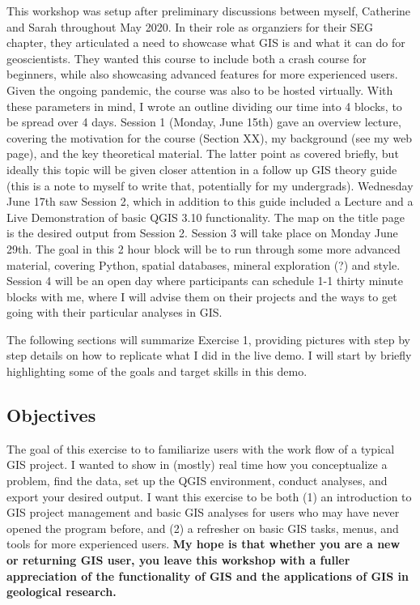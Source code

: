 \documentclass{article}
\begin{document}
This workshop was setup after preliminary discussions between myself, Catherine and Sarah throughout May 2020. In their role as organziers for their SEG chapter, they articulated a need to showcase what GIS is and what it can do for geoscientists. They wanted this course to include both a crash course for beginners, while also showcasing advanced features for more experienced users. Given the ongoing pandemic, the course was also to be hosted virtually. With these parameters in mind, I wrote an outline dividing our time into 4 blocks, to be spread over 4 days. Session 1 (Monday, June 15th) gave an overview lecture, covering the motivation for the course (Section XX), my background (see my web page), and the key theoretical material. The latter point as covered briefly, but ideally this topic will be given closer attention in a follow up GIS theory guide (this is a note to myself to write that, potentially for my undergrads). Wednesday June 17th saw Session 2, which in addition to this guide included a Lecture and a Live Demonstration of basic QGIS 3.10 functionality. The map on the title page is the desired output from Session 2. Session 3 will take place on Monday June 29th. The goal in this 2 hour block will be to run through some more advanced material, covering Python, spatial databases, mineral exploration (?) and style. Session 4 will be an open day where participants can schedule 1-1 thirty minute blocks with me, where I will advise them on their projects and the ways to get going with their particular analyses in GIS. 

The following sections will summarize Exercise 1, providing pictures with step by step details on how to replicate what I did in the live demo. I will start by briefly highlighting some of the goals and target skills in this demo. 

\subsection{Objectives}

The goal of this exercise to to familiarize users with the work flow of a typical GIS project. I wanted to show in (mostly) real time how you conceptualize a problem, find the data, set up the QGIS environment, conduct analyses, and export your desired output. I want this exercise to be both (1) an introduction to GIS project management and basic GIS analyses for users who may have never opened the program before, and (2) a refresher on basic GIS tasks, menus, and tools for more experienced users. \textbf{My hope is that whether you are a new or returning GIS user, you leave this workshop with a fuller appreciation of the functionality of GIS and the applications of GIS in geological research.} 
\end{document}
